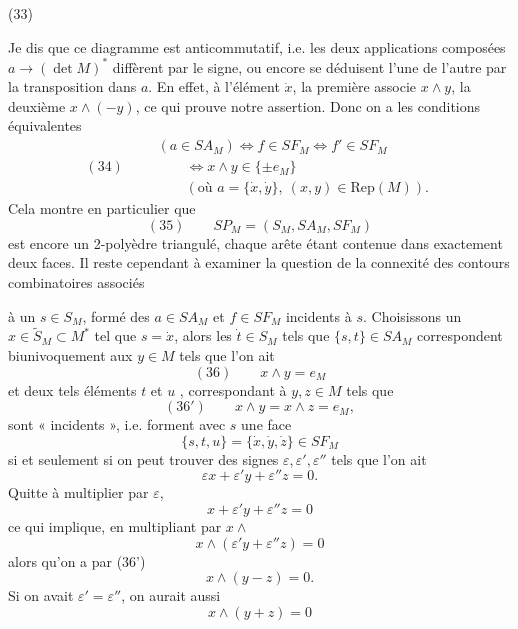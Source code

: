 \documentclass[11pt,a4paper]{article}
\begin{document}
(33)


Je dis que ce diagramme est anticommutatif, i.e. les deux applications composées $a \to (\det M)^*$ diffèrent par le signe, ou encore se déduisent l'une de l'autre par la transposition dans $a$. En effet, à l'élément $\dot{x}$, la première associe $x \wedge y$, la deuxième $x \wedge (-y)$, ce qui prouve notre assertion. Donc on a les conditions équivalentes
\[
(34)\qquad \begin{array}{l} (a \in SA_M) \iff f \in SF_M \iff f' \in SF_M \\ \qquad \iff x \wedge y \in \{\pm e_M\} \\ \qquad (\text{où } a = \{\dot{x}, \dot{y}\},\ (x,y) \in \mathrm{Rep}(M)) . \end{array}
\]
Cela montre en particulier que
\[
(35)\qquad SP_M = (S_M, SA_M, SF_M)
\]
est encore un 2-polyèdre triangulé, chaque arête étant contenue dans exactement deux faces. Il reste cependant à examiner la question de la connexité des contours combinatoires  associés

à un   $s \in S_M$, formé des $a \in SA_M$ et $f \in SF_M$ incidents à $s$. Choisissons un $x \in \widetilde{S}_M \subset M^*$ tel que $s = \dot{x}$, alors les $\dot{t} \in S_M$ tels que $\{s,t\} \in SA_M$ correspondent biunivoquement aux $y \in M$ tels que l'on ait
\[
(36)\qquad x \wedge y = e_M
\]
et deux tels éléments $t$  et $u$ , correspondant à $y, z \in M$ tels que
\[
(36')\qquad x \wedge y = x \wedge z = e_M ,
\]
sont « incidents », i.e. forment avec $s$ une face
\[
\{s,t,u\} = \{\dot{x}, \dot{y}, \dot{z}\} \in SF_M
\]
si et seulement si on peut trouver des signes $\varepsilon, \varepsilon', \varepsilon''$ tels que l'on ait
\[
\varepsilon x + \varepsilon' y + \varepsilon'' z = 0 .
\]
Quitte à multiplier par $\varepsilon$,  
\[
x + \varepsilon' y + \varepsilon'' z = 0
\]
ce qui implique, en multipliant par $x \wedge$
\[
x \wedge (\varepsilon' y + \varepsilon'' z) = 0
\]
alors qu'on a par (36')
\[
x \wedge (y - z) = 0 .
\]
Si on avait $\varepsilon' = \varepsilon''$, on aurait  aussi
\[
x \wedge (y + z) = 0
\]
\end{document}
